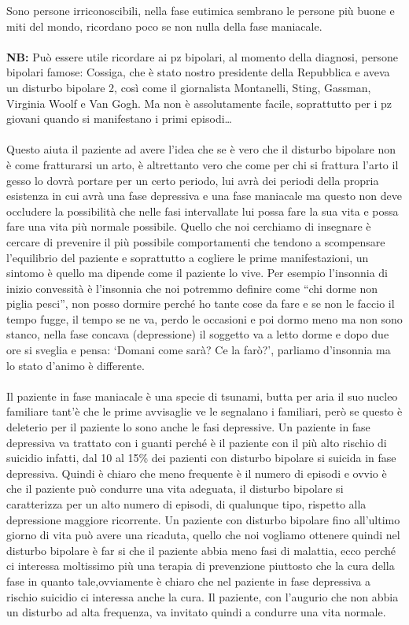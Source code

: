 \begin{itemize}
Sono persone irriconoscibili, nella fase eutimica sembrano le persone
più buone e miti del mondo, ricordano poco se non nulla della fase
maniacale.
\\\\
\textbf{NB:} Può essere utile ricordare ai pz bipolari, al momento della
diagnosi, persone bipolari famose: Cossiga, che è stato nostro
presidente della Repubblica e aveva un disturbo bipolare 2, così come il
giornalista Montanelli, Sting, Gassman, Virginia Woolf e Van Gogh. Ma
non è assolutamente facile, soprattutto per i pz giovani quando si
manifestano i primi episodi\ldots{}
\\\\
Questo aiuta il paziente ad avere l'idea che se è vero che il disturbo
bipolare non è come fratturarsi un arto, è altrettanto vero che come per
chi si frattura l'arto il gesso lo dovrà portare per un certo periodo,
lui avrà dei periodi della propria esistenza in cui avrà una fase
depressiva e una fase maniacale ma questo non deve occludere la
possibilità che nelle fasi intervallate lui possa fare la sua vita e
possa fare una vita più normale possibile. Quello che noi cerchiamo di
insegnare è cercare di prevenire il più possibile comportamenti che
tendono a scompensare l'equilibrio del paziente e soprattutto a cogliere
le prime manifestazioni, un sintomo è quello ma dipende come il paziente
lo vive. Per esempio l'insonnia di inizio convessità è l'insonnia che
noi potremmo definire come ``chi dorme non piglia pesci'', non posso
dormire perché ho tante cose da fare e se non le faccio il tempo fugge,
il tempo se ne va, perdo le occasioni e poi dormo meno ma non sono
stanco, nella fase concava (depressione) il soggetto va a letto dorme e
dopo due ore si sveglia e pensa: `Domani come sarà? Ce la farò?',
parliamo d'insonnia ma lo stato d'animo è differente.
\\\\
Il paziente in fase maniacale è una specie di tsunami, butta per aria il
suo nucleo familiare tant'è che le prime avvisaglie ve le segnalano i
familiari, però se questo è deleterio per il paziente lo sono anche le
fasi depressive. Un paziente in fase depressiva va trattato con i guanti
perché è il paziente con il più alto rischio di suicidio infatti, dal 10
al 15\% dei pazienti con disturbo bipolare si suicida in fase
depressiva. Quindi è chiaro che meno frequente è il numero di episodi e
ovvio è che il paziente può condurre una vita adeguata, il disturbo
bipolare si caratterizza per un alto numero di episodi, di qualunque
tipo, rispetto alla depressione maggiore ricorrente. Un paziente con
disturbo bipolare fino all'ultimo giorno di vita può avere una ricaduta,
quello che noi vogliamo ottenere quindi nel disturbo bipolare è far si
che il paziente abbia meno fasi di malattia, ecco perché ci interessa
moltissimo più una terapia di prevenzione piuttosto che la cura della
fase in quanto tale,ovviamente è chiaro che nel paziente in fase
depressiva a rischio suicidio ci interessa anche la cura. Il paziente,
con l'augurio che non abbia un disturbo ad alta frequenza, va invitato
quindi a condurre una vita normale.


\end{itemize}
